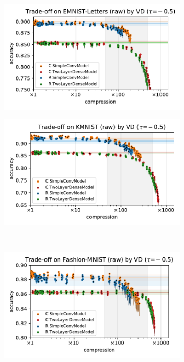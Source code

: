 \documentclass[a4paper,10pt,twocolumn]{article}
\begin{document}
\begin{figure}[b]
  \centering
  \begin{subfigure}[b]{0.5\columnwidth}
    \centering
    \includegraphics[width=\linewidth]{figure__mnist-like__trade-off/legacy__VD__emnist_letters__raw__-0.5.pdf}
  \end{subfigure}%
  \begin{subfigure}[b]{0.5\columnwidth}
    \centering
    \includegraphics[width=\linewidth]{figure__mnist-like__trade-off/legacy__VD__kmnist__raw__-0.5.pdf}
  \end{subfigure} \\%
  \begin{subfigure}[b]{0.5\columnwidth}
    \centering
    \includegraphics[width=\linewidth]{figure__mnist-like__trade-off/legacy__VD__fashionmnist__raw__-0.5.pdf}

\end{subfigure}
\end{figure}
\end{document}
